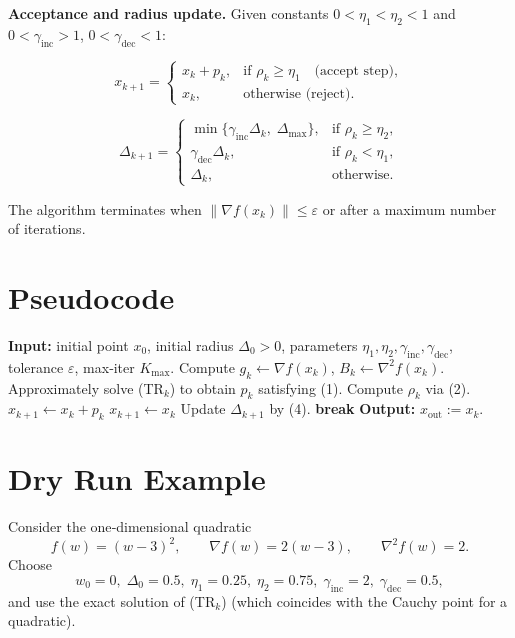 \documentclass{article}
\begin{document}
\noindent\textbf{Acceptance and radius update.}
Given constants $0<\eta_{1}<\eta_{2}<1$ and $0<\gamma_{\mathrm{inc}}>1$, $0<\gamma_{\mathrm{dec}}<1$:

\[
x_{k+1}= 
\begin{cases}
x_{k}+p_{k}, & \text{if }\rho_{k}\ge \eta_{1}\quad\text{(accept step)},\\[1mm]
x_{k},      & \text{otherwise (reject)} .
\end{cases}
\tag{3}
\]

\[
\Delta_{k+1}= 
\begin{cases}
\min\{\gamma_{\mathrm{inc}}\Delta_{k},\;\Delta_{\max}\}, & \text{if }\rho_{k}\ge \eta_{2},\\[1mm]
\gamma_{\mathrm{dec}}\Delta_{k}, & \text{if }\rho_{k}<\eta_{1},\\[1mm]
\Delta_{k}, & \text{otherwise}.
\end{cases}
\tag{4}
\]

The algorithm terminates when $\| \nabla f(x_{k})\| \le \varepsilon$ or after a maximum
number of iterations.

\section*{Pseudocode}
\begin{algorithm}[H]
\caption{Convex Trust‑Region (CTR) Method}
\begin{algorithmic}[1]
\State \textbf{Input:} initial point $x_{0}$, initial radius $\Delta_{0}>0$,
                 parameters $\eta_{1},\eta_{2},\gamma_{\mathrm{inc}},\gamma_{\mathrm{dec}}$, 
                 tolerance $\varepsilon$, max‑iter $K_{\max}$.
    \State Compute $g_{k}\gets \nabla f(x_{k})$, $B_{k}\gets\nabla^{2}f(x_{k})$.
    \State Approximately solve (TR$_k$) to obtain $p_{k}$ satisfying (1).
    \State Compute $\rho_{k}$ via (2).
        \State $x_{k+1}\gets x_{k}+p_{k}$ 
    \Else
        \State $x_{k+1}\gets x_{k}$ 
    \EndIf
    \State Update $\Delta_{k+1}$ by (4).
        \State \textbf{break}
    \EndIf
\EndFor
\State \textbf{Output:} $x_{\text{out}}:=x_{k}$.
\end{algorithmic}
\end{algorithm}

\section*{Dry Run Example}
Consider the one‑dimensional quadratic
\[
f(w)=(w-3)^{2},\qquad \nabla f(w)=2(w-3),\qquad \nabla^{2}f(w)=2 .
\]
Choose
\[
w_{0}=0,\;\Delta_{0}=0.5,\;
\eta_{1}=0.25,\;\eta_{2}=0.75,\;
\gamma_{\mathrm{inc}}=2,\;\gamma_{\mathrm{dec}}=0.5,
\]
and use the exact solution of (TR$_k$) (which coincides with the Cauchy point for a quadratic).
\end{document}
